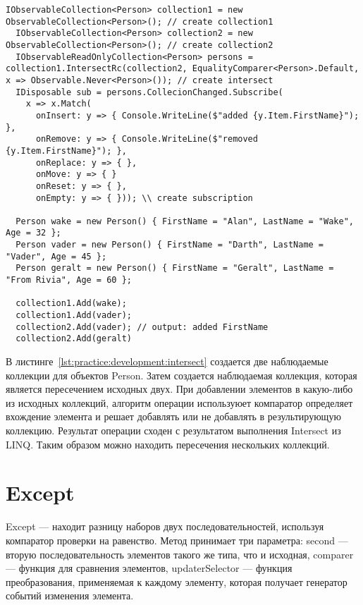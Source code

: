 \begin{lstlisting}[style=csharpinlinestyle, caption={Пример использования Intersect}, label=lst:practice:development:intersect]
  IObservableCollection<Person> collection1 = new ObservableCollection<Person>(); // create collection1
  IObservableCollection<Person> collection2 = new ObservableCollection<Person>(); // create collection2
  IObservableReadOnlyCollection<Person> persons = collection1.IntersectRc(collection2, EqualityComparer<Person>.Default, x => Observable.Never<Person>()); // create intersect
  IDisposable sub = persons.CollecionChanged.Subscribe(
    x => x.Match(
      onInsert: y => { Console.WriteLine($"added {y.Item.FirstName}"); },
      onRemove: y => { Console.WriteLine($"removed {y.Item.FirstName}"); },
      onReplace: y => { },
      onMove: y => { }
      onReset: y => { },
      onEmpty: y => { })); \\ create subscription

  Person wake = new Person() { FirstName = "Alan", LastName = "Wake", Age = 32 };
  Person vader = new Person() { FirstName = "Darth", LastName = "Vader", Age = 45 };
  Person geralt = new Person() { FirstName = "Geralt", LastName = "From Rivia", Age = 60 };

  collection1.Add(wake);
  collection1.Add(vader);
  collection2.Add(vader); // output: added FirstName
  collection2.Add(geralt)
\end{lstlisting}

В листинге~\ref{lst:practice:development:intersect} создается две наблюдаемые коллекции для объектов Per\-son. Затем создается наблюдаемая коллекция, которая является пересечением исходных двух.
При добавлении элементов в какую-либо из исходных коллекций, алгоритм операции используюет компаратор определяет вхождение элемента и решает добавлять или не добавлять в результирующую коллекцию.
Результат операции сходен с результатом выполнения Intersect из LINQ. Таким образом можно находить пересечения нескольких коллекций.

\section{Except}
\label{sub:development:except}

Except --- находит разницу наборов двух последовательностей, используя компаратор проверки на равенство.
Метод принимает три параметра: second --- вторую последовательность элементов такого же типа, что и исходная,
comparer --- функция для сравнения элементов, updaterSelector --- функция преобразования, применяемая к каждому элементу, которая получает генератор событий изменения элемента.

